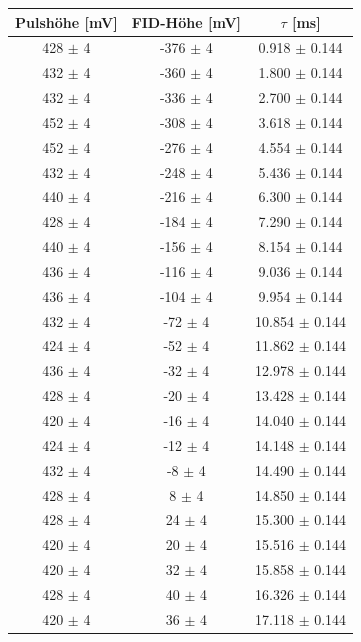\documentclass[12pt,a4paper]{article}
\begin{document}
\begin{table}
\centering
\begin{tabular}{|c|c|c|}
\hline 
Pulshöhe [mV] & FID-Höhe [mV] & $\tau$ [ms] \\ 
\hline 
428 $\pm$ 4 & -376 $\pm$ 4 & 0.918 $\pm$ 0.144 \\ 
\hline 
432 $\pm$ 4 & -360 $\pm$ 4 & 1.800 $\pm$ 0.144 \\ 
\hline 
432 $\pm$ 4 & -336 $\pm$ 4 & 2.700 $\pm$ 0.144 \\ 
\hline 
452 $\pm$ 4 & -308 $\pm$ 4 & 3.618 $\pm$ 0.144 \\ 
\hline 
452 $\pm$ 4 & -276 $\pm$ 4 & 4.554 $\pm$ 0.144 \\ 
\hline 
432 $\pm$ 4 & -248 $\pm$ 4 & 5.436 $\pm$ 0.144 \\ 
\hline 
440 $\pm$ 4 & -216 $\pm$ 4 & 6.300 $\pm$ 0.144 \\ 
\hline 
428 $\pm$ 4 & -184 $\pm$ 4 & 7.290 $\pm$ 0.144 \\ 
\hline 
440 $\pm$ 4 & -156 $\pm$ 4 & 8.154 $\pm$ 0.144 \\ 
\hline 
436 $\pm$ 4 & -116 $\pm$ 4 & 9.036 $\pm$ 0.144 \\ 
\hline 
436 $\pm$ 4 & -104 $\pm$ 4 & 9.954 $\pm$ 0.144 \\ 
\hline 
432 $\pm$ 4 & -72 $\pm$ 4 & 10.854 $\pm$ 0.144 \\ 
\hline 
424 $\pm$ 4 & -52 $\pm$ 4 & 11.862 $\pm$ 0.144 \\ 
\hline 
436 $\pm$ 4 & -32 $\pm$ 4 & 12.978 $\pm$ 0.144 \\ 
\hline 
428 $\pm$ 4 & -20 $\pm$ 4 & 13.428 $\pm$ 0.144 \\ 
\hline 
420 $\pm$ 4 & -16 $\pm$ 4 & 14.040 $\pm$ 0.144 \\ 
\hline 
424 $\pm$ 4 & -12 $\pm$ 4 & 14.148 $\pm$ 0.144 \\ 
\hline 
432 $\pm$ 4 & -8 $\pm$ 4 & 14.490 $\pm$ 0.144 \\ 
\hline 
428 $\pm$ 4 & 8 $\pm$ 4 & 14.850 $\pm$ 0.144 \\ 
\hline 
428 $\pm$ 4 & 24 $\pm$ 4 & 15.300 $\pm$ 0.144 \\ 
\hline 
420 $\pm$ 4 & 20 $\pm$ 4 & 15.516 $\pm$ 0.144 \\ 
\hline 
420 $\pm$ 4 & 32 $\pm$ 4 & 15.858 $\pm$ 0.144 \\ 
\hline 
428 $\pm$ 4 & 40 $\pm$ 4 & 16.326 $\pm$ 0.144 \\ 
\hline 
420 $\pm$ 4 & 36 $\pm$ 4 & 17.118 $\pm$ 0.144 \\ 
\hline 

\end{tabular}
\end{table}
\end{document}
